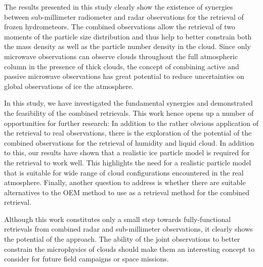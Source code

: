\documentclass[journal abbreviation, manuscript]{copernicus}
\begin{document}
\conclusions  %
\label{sec:conclusions}

The results presented in this study clearly show the existence of synergies
between sub-millimeter radiometer and radar observations for the retrieval of
frozen hydrometeors. The combined observations allow the retrieval of two
moments of the particle size distribution and thus help to better constrain
both the mass density as well as the particle number density in the cloud.
Since only microwave observations can observe clouds throughout the full
atmospheric column in  the presence of thick clouds, the concept of combining
active and passive microwave observations has great potential to reduce uncertainties
on global observations of ice the atmosphere.

In this study, we have investigated the fundamental synergies and demonstrated
the feasibility of the combined retrievals. This work hence opens up a number of
opportunities for further research: In addition to the rather obvious
application of the retrieval to real observations, there is the exploration of
the potential of the combined observations for the retrieval of humidity and
liquid cloud. In addition to this, our results have shown that a realistic ice
particle model is required for the retrieval to work well. This highlights the
need for a realistic particle model that is suitable for wide range of cloud
configurations encountered in the real atmosphere. Finally, another question to
address is whether there are suitable alternatives to the OEM method to use as a
retrieval method for the combined retrieval.

Although this work constitutes only a small step towards fully-functional
retrievals from combined radar and sub-millimeter observations, it clearly shows
the potential of the approach. The ability of the joint observations to better
constrain the microphysics of clouds should make them an interesting concept to
consider for future field campaigns or space missions.



\end{document}
